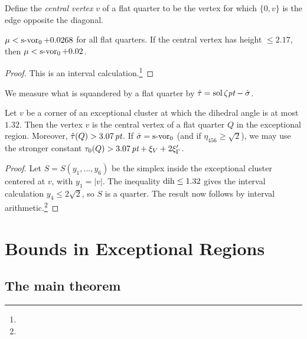 Define the {\it central vertex\/} $v$ of a flat quarter to be the
vertex for which $\{0,v\}$ is the edge opposite the diagonal.


\begin{lemma}
$\mu < \operatorname{s-vor}_0 +0.0268$ for all flat quarters. If the central
vertex has height $\le2.17$, then $\mu<\operatorname{s-vor}_0+0.02$.
\end{lemma}

\begin{proof}
This is an interval calculation.\footnote{} %
\end{proof}


We  measure what is squandered by a flat quarter by $\hat\tau =
\operatorname{sol}\zeta\hbox{\it pt} - \hat\sigma$.

\begin{lemma}\label{lemma:1.32}
Let $v$ be a corner of an exceptional cluster at which the
dihedral angle is at most $1.32$. Then the vertex $v$ is the
central vertex of a flat quarter $Q$ in the exceptional region.
Moreover, $\hat\tau(Q)>3.07\,\hbox{\it pt}$. If $\hat\sigma=\operatorname{s-vor}_0$ (and if
$\eta_{456}\ge\sqrt2$), we may use the stronger constant
$\tau_0(Q)> 3.07\,\hbox{\it pt}+\xi_V+2\xi_\Gamma'$.
\end{lemma}


\begin{proof} Let $S=S(y_1,\ldots,y_6)$ be the simplex inside the exceptional
cluster centered at $v$, with $y_1=|v|$. The inequality $\operatorname{dih}\le 1.32$
gives the interval calculation $y_4\le 2\sqrt{2}$, so $S$ is a quarter.
The result now follows by
interval arithmetic.\footnote{} %
\end{proof}


\chapter{Bounds in Exceptional Regions}
    \label{sec:BER}






\section{The main theorem}
    \label{sec:the-main-theorem}

